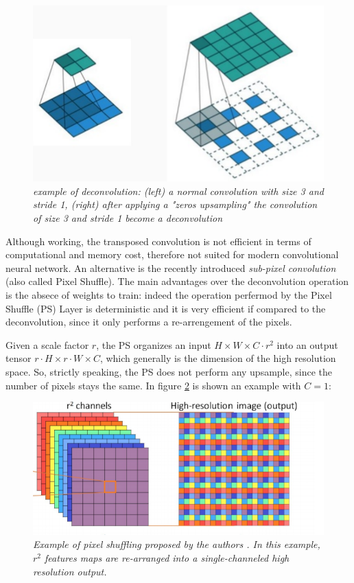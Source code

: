 \documentclass[12pt,a4paper]{report}
\begin{document}
\begin{figure}[h]
 \centering
 \includegraphics[scale=0.35]{./images/deconv.png}
 \caption{\it example of deconvolution: (left) a normal convolution with size 3 and stride 1, (right) after applying a "zeros upsampling" the convolution of size 3 and stride 1 become a deconvolution}
 \label{fig:deconv}
\end{figure}

Although working, the transposed convolution is not efficient in terms of computational and memory cost, therefore not suited for modern convolutional neural network. 
An alternative is the recently introduced {\it sub-pixel convolution} \cite{pixelshuffle} (also called Pixel Shuffle). The main advantages over the deconvolution operation is the absece of weights to train: indeed the operation perfermod by the Pixel Shuffle (PS) Layer is deterministic and it is very efficient if compared to the deconvolution, since it only performs a re-arrengement of the pixels. 

Given a scale factor $r$, the PS organizes an input $H \times W \times C \cdot r^2$ into an output tensor $r \cdot H \times r \cdot W \times C$, which generally is the dimension of the high resolution space. 
So, strictly speaking, the PS does not perform any upsample, since the number of pixels stays the same. 
In figure \ref{fig:pixelshuffle1} is shown an example with $C=1$:

\begin{figure}[h]
 \centering
 \includegraphics[scale=0.35]{./images/pixelshuffle.png}
 \caption{\it Example of pixel shuffling proposed by the authors \cite{pixelshuffle}. In this example, $r^2$ features maps are re-arranged into a single-channeled high resolution output.}
 \label{fig:pixelshuffle1}
\end{figure}
\end{document}
